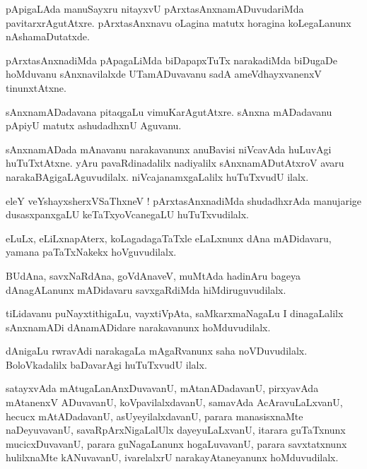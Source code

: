 \documentclass{article}
\begin{document}
\begin{mn}
pApigaLAda manuSayxru nitayxvU pArxtasAnxnamADuvudariMda pavitarxrAgutAtxre. pArxtasAnxnavu oLagina 
matutx horagina koLegaLanunx nAshamaDutatxde.
\end{mn}

\begin{mn}
pArxtasAnxnadiMda pApagaLiMda biDapapxTuTx narakadiMda biDugaDe hoMduvanu sAnxnavilalxde 
UTamADuvavanu sadA ameVdhayxvanenxV tinunxtAtxne.
\end{mn}

\begin{mn}
sAnxnamADadavana pitaqgaLu vimuKarAgutAtxre. sAnxna mADadavanu pApiyU matutx ashudadhxnU Aguvanu.
\end{mn}

\begin{mn}
sAnxnamADada mAnavanu narakavanunx anuBavisi niVcavAda huLuvAgi huTuTxtAtxne. yAru pavaRdinadalilx 
nadiyalilx  sAnxnamADutAtxroV avaru narakaBAgigaLAguvudilalx. niVcajanamxgaLalilx huTuTxvudU ilalx.
\end{mn}

\begin{mn}
eleY veYshayxsherxVSaThxneV ! pArxtasAnxnadiMda shudadhxrAda manujarige dusasxpanxgaLU 
keTaTxyoVcanegaLU huTuTxvudilalx.
\end{mn}

\begin{mn}
eLuLx, eLiLxnapAterx, koLagadagaTaTxle eLaLxnunx dAna mADidavaru, yamana paTaTxNakekx hoVguvudilalx.
\end{mn}

\begin{mn}
BUdAna, savxNaRdAna, goVdAnaveV, muMtAda hadinAru bageya dAnagALanunx mADidavaru savxgaRdiMda 
hiMdiruguvudilalx.
\end{mn}

\begin{mn}
tiLidavanu puNayxtithigaLu, vayxtiVpAta, saMkarxmaNagaLu I dinagaLalilx sAnxnamADi dAnamADidare 
narakavanunx hoMduvudilalx. 
\end{mn}

\begin{mn}
dAnigaLu rwravAdi narakagaLa mAgaRvanunx saha noVDuvudilalx. BoloVkadalilx baDavarAgi huTuTxvudU 
ilalx.
\end{mn}

\begin{mn}
satayxvAda mAtugaLanAnxDuvavanU, mAtanADadavanU, pirxyavAda mAtanenxV ADuvavanU, koVpavilalxdavanU,
samavAda AcAravuLaLxvanU, hecucx mAtADadavanU, asUyeyilalxdavanU, parara manasisxnaMte naDeyuvavanU,
savaRpArxNigaLalUlx dayeyuLaLxvanU, itarara guTaTxnunx mucicxDuvavanU, parara guNagaLanunx 
hogaLuvavanU, parara savxtatxnunx hulilxnaMte kANuvavanU, ivarelalxrU narakayAtaneyanunx 
hoMduvudilalx.
\end{mn}
\end{document}
